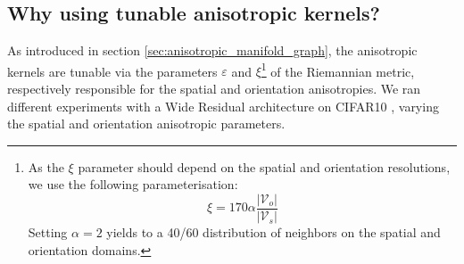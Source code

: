 \documentclass{article}
\begin{document}
\subsection{Why using tunable anisotropic kernels?} 

As introduced in section \ref{sec:anisotropic_manifold_graph}, the anisotropic kernels are tunable via the parameters $\varepsilon$ and $\xi$\footnote{As the $\xi$ parameter should depend on the spatial and orientation resolutions, we use the following parameterisation:
\begin{equation}
\xi = 170\alpha \frac{|\mathcal{V}_o|}{|\mathcal{V}_s|}
\end{equation}
Setting $\alpha = 2$ yields to a 40/60 distribution of neighbors on the spatial and orientation domains.}
of the Riemannian metric, respectively responsible for the spatial and orientation anisotropies. We ran different experiments with a Wide Residual architecture \citep{zagoruyko2016wide} on CIFAR10 \citep{krizhevsky2009learning}, varying the spatial and orientation anisotropic parameters. 
\end{document}

